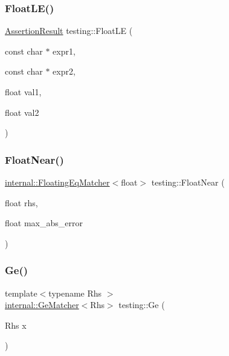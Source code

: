 \mbox{\label{namespacetesting_a2c9a2a391c72a7b02ea3024586e33af0}} 
\subsubsection{\texorpdfstring{Float\+L\+E()}{FloatLE()}}
{\footnotesize\ttfamily \hyperlink{classtesting_1_1_assertion_result}{Assertion\+Result} testing\+::\+Float\+LE (\begin{DoxyParamCaption}\item[{const char $\ast$}]{expr1,  }\item[{const char $\ast$}]{expr2,  }\item[{float}]{val1,  }\item[{float}]{val2 }\end{DoxyParamCaption})}

\mbox{\label{namespacetesting_a933a78452dd1770669bed758f35ff250}} 
\subsubsection{\texorpdfstring{Float\+Near()}{FloatNear()}}
{\footnotesize\ttfamily \hyperlink{classtesting_1_1internal_1_1_floating_eq_matcher}{internal\+::\+Floating\+Eq\+Matcher}$<$float$>$ testing\+::\+Float\+Near (\begin{DoxyParamCaption}\item[{float}]{rhs,  }\item[{float}]{max\+\_\+abs\+\_\+error }\end{DoxyParamCaption})\hspace{0.3cm}{\ttfamily [inline]}}

\mbox{\label{namespacetesting_a42bb19b42d7830b972973a103d5e00f2}} 
\subsubsection{\texorpdfstring{Ge()}{Ge()}\hspace{0.1cm}{\footnotesize\ttfamily [1/2]}}
{\footnotesize\ttfamily template$<$typename Rhs $>$ \\
\hyperlink{classtesting_1_1internal_1_1_ge_matcher}{internal\+::\+Ge\+Matcher}$<$Rhs$>$ testing\+::\+Ge (\begin{DoxyParamCaption}\item[{Rhs}]{x }\end{DoxyParamCaption})\hspace{0.3cm}{\ttfamily [inline]}}

